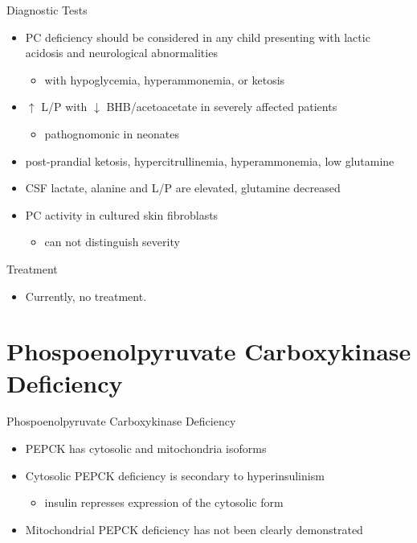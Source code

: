 \documentclass[presentation, smaller]{beamer}
\begin{document}
\begin{frame}[label={sec:org7cbf8f6}]{Diagnostic Tests}
\begin{itemize}
\item PC deficiency should be considered in any child presenting with lactic acidosis and neurological abnormalities
\begin{itemize}
\item with hypoglycemia, hyperammonemia, or ketosis
\end{itemize}

\item \(\uparrow\) L/P with \(\downarrow\) BHB/acetoacetate  in severely affected patients
\begin{itemize}
\item pathognomonic in neonates
\end{itemize}

\item post-prandial ketosis, hypercitrullinemia, hyperammonemia, low glutamine

\item CSF lactate, alanine and L/P are elevated, glutamine decreased

\item PC activity in cultured skin fibroblasts
\begin{itemize}
\item can not distinguish severity
\end{itemize}
\end{itemize}
\end{frame}

\begin{frame}[label={sec:orgb71ecaf}]{Treatment}
\begin{itemize}
\item Currently, no treatment.
\end{itemize}
\end{frame}

\section{Phospoenolpyruvate Carboxykinase Deficiency}
\label{sec:orgeca828c}
\begin{frame}[label={sec:org8454c12}]{Phospoenolpyruvate Carboxykinase Deficiency}
\begin{itemize}
\item PEPCK has cytosolic and mitochondria isoforms
\item Cytosolic PEPCK deficiency is secondary to hyperinsulinism
\begin{itemize}
\item insulin represses expression of the cytosolic form
\end{itemize}
\item Mitochondrial PEPCK deficiency has not been clearly demonstrated
\end{itemize}
\end{frame}
\end{document}
